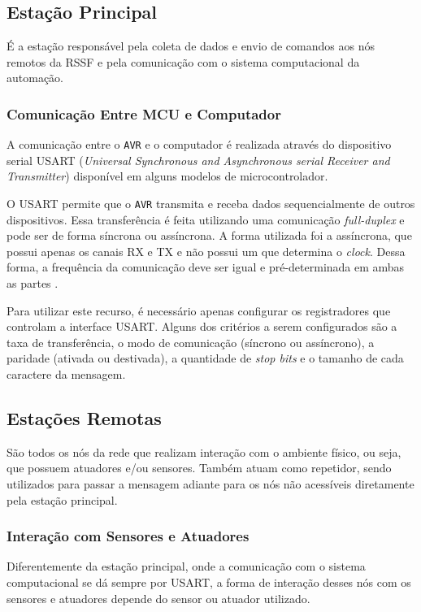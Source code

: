 \subsection{Estação Principal}
É a estação responsável pela coleta de dados e envio de comandos aos nós remotos da RSSF e pela comunicação
com o sistema computacional da automação.

\subsubsection{Comunicação Entre MCU e Computador}
A comunicação entre o \texttt{AVR} e o computador é realizada através do dispositivo serial USART
(\textit{Universal Synchronous and Asynchronous serial Receiver and Transmitter}) disponível em alguns modelos
de microcontrolador.

O USART permite que o \texttt{AVR} transmita e receba dados sequencialmente de outros dispositivos. Essa
transferência é feita utilizando uma comunicação \textit{full-duplex} e pode ser de forma síncrona ou
assíncrona. A forma utilizada foi a assíncrona, que possui apenas os canais RX e TX e não possui um que
determina o \textit{clock}. Dessa forma, a frequência da comunicação deve ser igual e pré-determinada em ambas
as partes \cite{williams2014}.

Para utilizar este recurso, é necessário apenas configurar os registradores que controlam a interface USART.
Alguns dos critérios a serem configurados são a taxa de transferência, o modo de comunicação (síncrono ou
assíncrono), a paridade (ativada ou destivada), a quantidade de \textit{stop bits} e o tamanho de cada
caractere da mensagem.

\subsection{Estações Remotas}
São todos os nós da rede que realizam interação com o ambiente físico, ou seja, que possuem atuadores e/ou
sensores. Também atuam como repetidor, sendo utilizados para passar a mensagem adiante para os nós não acessíveis
diretamente pela estação principal.

\subsubsection{Interação com Sensores e Atuadores}
Diferentemente da estação principal, onde a comunicação com o sistema computacional se dá sempre por USART, a
forma de interação desses nós com os sensores e atuadores depende do sensor ou atuador utilizado.

